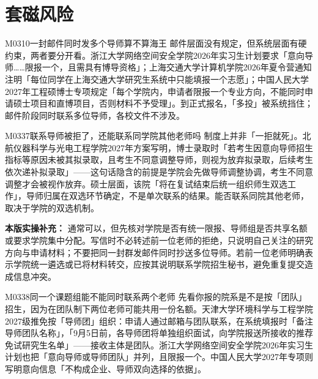 \section{套磁风险}
\begin{qa}{M0310}{一封邮件同时发多个导师算不算海王}
邮件层面没有规定，但系统层面有硬约束，两者要分开看。浙江大学网络空间安全学院2026年实习生计划要求「意向导师……限报一个，且需具有博导资格」；上海交通大学计算机学院2026年夏令营通知注明「每位同学在上海交通大学研究生系统中只能填报一个志愿」；中国人民大学2027年工程硕博士专项规定「每个学院内，申请者限报一个专业方向，不能同时申请硕士项目和直博项目，否则材料不予受理」。到正式报名，「多投」被系统挡住；邮件阶段同时联系多位导师，各校文件不涉及。
\end{qa}

\begin{qa}{M0337}{联系导师被拒了，还能联系同学院其他老师吗}
制度上并非「一拒就死」。北航仪器科学与光电工程学院2027年方案写明，博士录取时「若考生因意向导师招生指标等原因未被其拟录取，且考生不同意调整导师，则视为放弃拟录取，后续考生依次递补拟录取」——这句话隐含的前提是学院会先做导师调整协调，考生不同意调整才会被视作放弃。硕士层面，该院「将在复试结束后统一组织师生双选工作」，导师归属在双选环节确定，不是单次联系的结果。能否联系同院其他老师，取决于学院的双选机制。
\par\textbf{本版实操补充：} 通常可以，但先核对学院是否有统一限报、导师组是否共享名额或要求学院集中分配。写信时不必转述前一位老师的拒绝，只说明自己关注的研究方向与申请材料；不要把同一封群发邮件同时抄送多位导师。若前一位老师明确表示学院统一遴选或已将材料转交，应按其说明联系学院招生秘书，避免重复提交造成信息冲突。
\end{qa}

\begin{qa}{M0338}{同一个课题组能不能同时联系两个老师}
先看你报的院系是不是按「团队」招生，因为在团队制下两位老师可能共用一份名额。天津大学环境科学与工程学院2027级推免按「导师团」组织：申请人通过邮箱与团队联系，在系统填报时「备注导师团队名称」，「9月5日前，各导师团将单独组织面试，向学院报送所接收的推荐免试研究生名单」——接收主体是团队。浙江大学网络空间安全学院2026年实习生计划也把「意向导师或导师团队」并列，且限报一个。中国人民大学2027年专项则写明意向信息「不构成企业、导师双向选择的依据」。
\end{qa}

